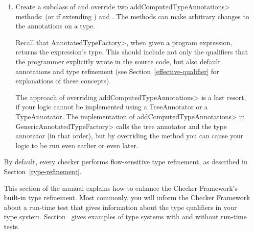 \begin{enumerate}
\item
  Create a subclass of  and
  override two \<addComputedTypeAnnotations> methods:
  (or
  if extending )
  and
  .
  The methods can make arbitrary changes to the annotations on a type.

  Recall that \<AnnotatedTypeFactory>, when given a program
  expression, returns the expression's type.  This should include not only
  the qualifiers that the programmer explicitly wrote in the source code, but
  also default annotations and type
  refinement (see Section~\ref{effective-qualifier} for explanations of these
  concepts).

  The approach of overriding \<addComputedTypeAnnotations> is a last
  resort, if your logic cannot be implemented using a TreeAnnotator or a
  TypeAnnotator.  The implementation of \<addComputedTypeAnnotations> in
  \<GenericAnnotatedTypeFactory> calls the tree annotator and the type
  annotator (in that order), but by overriding the method you can cause
  your logic to be run even earlier or even later.

\end{enumerate}



By default, every checker performs flow-sensitive type refinement, as described
in Section~\ref{type-refinement}.

This section of the manual explains how to enhance the Checker Framework's
built-in type refinement.
Most commonly, you will inform the Checker Framework about a run-time test
that gives information about the type qualifiers in your type system.
Section~ gives examples of
type systems with and without run-time tests.

